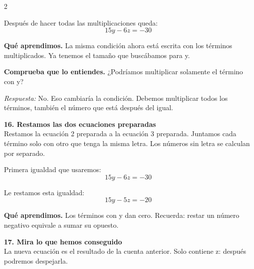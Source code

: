 \documentclass[11pt,a4paper,landscape]{article}
\begin{document}
\begin{multicols*}{2}
\begin{minipage}{\linewidth}
\par\smallskip Después de hacer todas las multiplicaciones queda:
\[15y - 6z = -30\]
\par\smallskip\textbf{Qué aprendimos.} La misma condición ahora está escrita con los términos multiplicados. Ya tenemos el tamaño que buscábamos para y.
\par\smallskip\textbf{Comprueba que lo entiendes.} ¿Podríamos multiplicar solamente el término con y?\par\textit{Respuesta:} No. Eso cambiaría la condición. Debemos multiplicar todos los términos, también el número que está después del igual.
\end{minipage}\par\medskip
\noindent\begin{minipage}{\linewidth}\textbf{16. Restamos las dos ecuaciones preparadas}\\[2pt]Restamos la ecuación 2 preparada a la ecuación 3 preparada. Juntamos cada término solo con otro que tenga la misma letra. Los números sin letra se calculan por separado.
\par{}\par\smallskip
\par\smallskip Primera igualdad que usaremos:
\[15y - 6z = -30\]
\par\smallskip Le restamos esta igualdad:
\[15y - 5z = -20\]
\par\smallskip\textbf{Qué aprendimos.} Los términos con y dan cero. Recuerda: restar un número negativo equivale a sumar su opuesto.
\end{minipage}\par\medskip
\noindent\begin{minipage}{\linewidth}\textbf{17. Mira lo que hemos conseguido}\\[2pt]La nueva ecuación es el resultado de la cuenta anterior. Solo contiene z: después podremos despejarla.

\end{minipage}
\end{multicols*}
\end{document}
